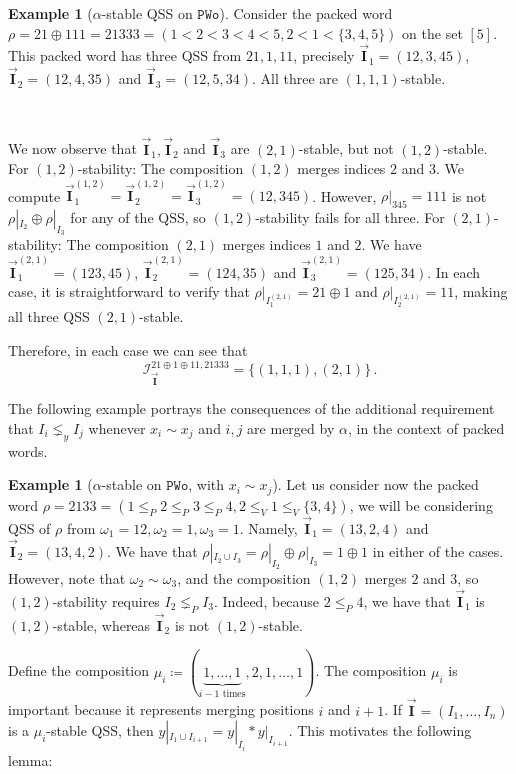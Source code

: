 \documentclass[12pt, reqno]{amsart}
\theoremstyle{definition}
\newtheorem{smpl}[thm]{Example}
\newcommand{\III}{\vec{\mathbf{I}}}
\begin{document}
\begin{smpl}[$\alpha$-stable QSS on $\mathtt{PWo}$]
Consider the packed word $\rho = 21 \oplus 111 = 21333 = (1 < 2 < 3 < 4 < 5, 2 < 1 < \{3, 4, 5\})$ on the set $[5]$.
This packed word has three QSS from $21, 1, 11$, precisely $\III_1 =(12, 3, 45)$, $\III_2 =(12, 4, 35)$ and $\III_3 =(12, 5, 34)$.
All three are $(1, 1, 1)$-stable.

\

We now observe that $\III_1, \III_2$ and $\III_3$ are $(2, 1)$-stable, but not $(1, 2)$-stable.
For $(1, 2)$-stability: The composition $(1, 2)$ merges indices $2$ and $3$. We compute $\III_1^{(1, 2)} = \III_2^{(1, 2)} = \III_3^{(1, 2)} = (12, 345)$. However, $\rho|_{345} = 111$ is not $\rho|_{I_2} \oplus \rho|_{I_3}$ for any of the QSS, so $(1, 2)$-stability fails for all three.
For $(2, 1)$-stability: The composition $(2, 1)$ merges indices $1$ and $2$. We have $\III_1^{(2, 1)} = (123, 45)$, $\III_2^{(2, 1)} = (124, 35)$ and $\III_3^{(2, 1)} = (125, 34)$. In each case, it is straightforward to verify that $\rho|_{I_1^{(2, 1)}} = 21\oplus 1$ and $\rho|_{I_2^{(2, 1)}} = 11$, making all three QSS $(2, 1)$-stable.

Therefore, in each case we can see that
$$\mathcal I_{\III}^{21\oplus 1\oplus 11, 21333} = \{(1, 1, 1), (2, 1)\}\, . $$
\end{smpl}


The following example portrays the consequences of the additional requirement that $I_i \lneq_y I_j$ whenever $x_i \sim x_j$ and $i, j$ are merged by $\alpha$, in the context of packed words.

\begin{smpl}[$\alpha$-stable on $\mathtt{PWo}$, with $x_i \sim x_j$]
Let us consider now the packed word $\rho = 2133 = (1 \leq_P 2 \leq_P 3 \leq_P 4, 2 \leq_V 1 \leq_V \{3, 4\} )$, we will be considering QSS of $\rho$ from $\omega_1 = 12, \omega_2 = 1, \omega_3 = 1$.
Namely, $\III_1 = (13, 2, 4)$ and $\III_2 = (13, 4, 2)$.
We have that $\rho|_{I_2 \cup I_3} = \rho|_{I_2} \oplus \rho|_{I_3} = 1 \oplus 1$ in either of the cases.
However, note that $\omega_2 \sim \omega_3$, and the composition $(1, 2)$ merges $2$ and $3$, so $(1, 2)$-stability requires $I_2 \lneq_P I_3$.
Indeed, because $2 \leq_P 4$, we have that $\III_1$ is $(1, 2)$-stable, whereas $\III_2$ is not $(1, 2)$-stable.
\end{smpl}


Define the composition $\mu_i \coloneqq (\underbrace{1, \dots , 1}_\text{$i-1$ times}, 2, 1, \dots, 1)$.
The composition $\mu_i$ is important because it represents merging positions $i$ and $i+1$.
If $\III = (I_1, \dots, I_n)$ is a $\mu_i$-stable QSS, then $y|_{I_1 \cup I_{i+1}} = y|_{I_i} \ast y|_{I_{i+1}}$.
This motivates the following lemma:
\end{document}
